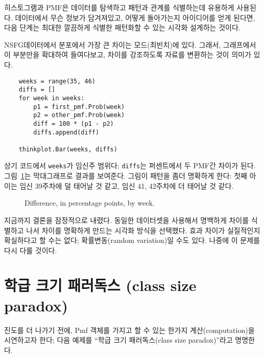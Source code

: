 히스토그램과 PMF은 데이터를 탐색하고 패턴과 관계를 식별하는데 유용하게 사용된다. 데이터에서 무슨 정보가 담겨져있고, 어떻게 돌아가는지 아이디어를 얻게 된다면, 다음 단계는 최대한 깔끔하게 식별한 패턴화할 수 있는 시각화 설계하는 것이다. 


NSFG데이터에서 분포에서 가장 큰 차이는 모드(최빈치)에 있다. 그래서, 그래프에서 이 부분만을 확대하여 들여다보고, 차이를 강조하도록 자료를 변환하는 것이 의미가 있다.


\begin{verbatim}
    weeks = range(35, 46)
    diffs = []
    for week in weeks:
        p1 = first_pmf.Prob(week)
        p2 = other_pmf.Prob(week)
        diff = 100 * (p1 - p2)
        diffs.append(diff)

    thinkplot.Bar(weeks, diffs)
\end{verbatim}

상기 코드에서 {\tt weeks}가 임신주 범위다; {\tt diffs}는 퍼센트에서 두 PMF간 차이가 된다.  
그림~\ref{probability_nsfg_diffs}는 막대그래프로 결과를 보여준다.
그림이 패턴을 좀더 명확하게 한다: 첫째 아이는 임신 39주차에 덜 태어날 것 같고, 임신 41, 42주차에 더 태어날 것 같다.

\begin{figure}
\caption{Difference, in percentage points, by week.}
\label{probability_nsfg_diffs}
\end{figure}

지금까지 결론을 잠정적으로 내렸다. 동일한 데이터셋을 사용해서 명백하게 차이를 식별하고 나서 차이를 명확하게 만드는 시각화 방식을 선택했다. 효과 차이가 실질적인지 확실하다고 할 수는 없다; 확률변동(random variation)일 수도 있다. 나중에 이 문제를 다시 다룰 것이다.


\section{학급 크기 패러독스 (class size paradox)}

진도를 더 나가기 전에, Pmf 객체를 가지고 할 수 있는 한가지 계산(computation)을 시연하고자 한다; 다음 예제를 ``학급 크기 패러독스(class size paradox)''라고 명명한다.

